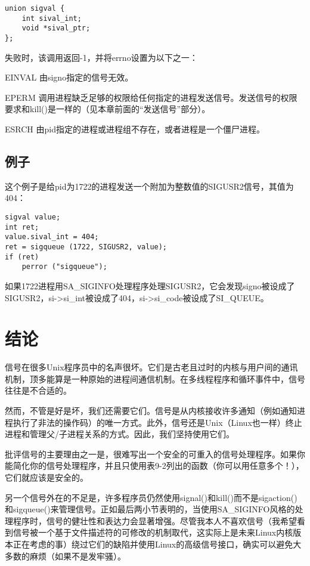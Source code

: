 \begin{lstlisting}
union sigval {
    int sival_int;
    void *sival_ptr;
};
\end{lstlisting}

失败时，该调用返回-1，并将errno设置为以下之一：

\begin{eqlist*}
\item[EINVAL] 由signo指定的信号无效。
\item[EPERM] 调用进程缺乏足够的权限给任何指定的进程发送信号。发送信号的权限要求和kill()是一样的（见本章前面的“发送信号”部分）。
\item[ESRCH] 由pid指定的进程或进程组不存在，或者进程是一个僵尸进程。
\end{eqlist*}

\subsection{例子}

这个例子是给pid为1722的进程发送一个附加为整数值的SIGUSR2信号，其值为404：

\begin{lstlisting}
sigval value;
int ret;
value.sival_int = 404;
ret = sigqueue (1722, SIGUSR2, value);
if (ret)
    perror ("sigqueue");
\end{lstlisting}

如果1722进程用SA\_SIGINFO处理程序处理SIGUSR2，它会发现signo被设成了SIGUSR2，si->si\_int被设成了404，si->si\_code被设成了SI\_QUEUE。

\section{结论}

信号在很多Unix程序员中的名声很坏。它们是古老且过时的内核与用户间的通讯机制，顶多能算是一种原始的进程间通信机制。在多线程程序和循环事件中，信号往往是不合适的。

然而，不管是好是坏，我们还需要它们。信号是从内核接收许多通知（例如通知进程执行了非法的操作码）的唯一方式。此外，信号还是Unix（Linux也一样）终止进程和管理父/子进程关系的方式。因此，我们坚持使用它们。

批评信号的主要理由之一是，很难写出一个安全的可重入的信号处理程序。如果你能简化你的信号处理程序，并且只使用表9-2列出的函数（你可以用任意多个！），它们就应该是安全的。

另一个信号外在的不足是，许多程序员仍然使用signal()和kill()而不是sigaction()和sigqueue()来管理信号。正如最后两小节表明的，当使用SA\_SIGINFO风格的处理程序时，信号的健壮性和表达力会显著增强。尽管我本人不喜欢信号（我希望看到信号被一个基于文件描述符的可修改的机制取代，这实际上是未来Linux内核版本正在考虑的事）绕过它们的缺陷并使用Linux的高级信号接口，确实可以避免大多数的麻烦（如果不是发牢骚）。
